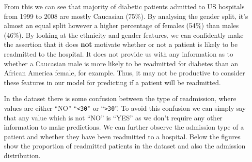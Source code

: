 \documentclass[11pt]{report}
\newcommand{\linespace}{\vspace{0.3cm}\noindent}
\begin{document}
\linespace
From this we can see that majority of diabetic patients admitted to US hospitals from 1999 to 2008 are mostly Caucasian (75\%). By analysing the gender split, it's almost an equal split however a higher percentage of females (54\%) than males (46\%). By looking at the ethnicity and gender features, we can confidently make the assertion that it does \textbf{not} motivate whether or not a patient is likely to be readmitted to the hospital. It does not provide us with any information as to whether a Caucasian male is more likely to be readmitted for diabetes than an African America female, for example. Thus, it may not be productive to consider these features in our model for predicting if a patient will be readmitted. 

\linespace
In the dataset there is some confusion between the type of readmission, where values are either ``NO'' ``\texttt{<30}'' or ``\texttt{>30}''. To avoid this confusion we can simply say that any value which is not ``NO'' is ``YES'' as we don't require any other information to make predictions. We can further observe the admission type of a patient and whether they have been readmitted to a hospital. Below the figures show the proportion of readmitted patients in the dataset and also the admission distribution.
\end{document}
